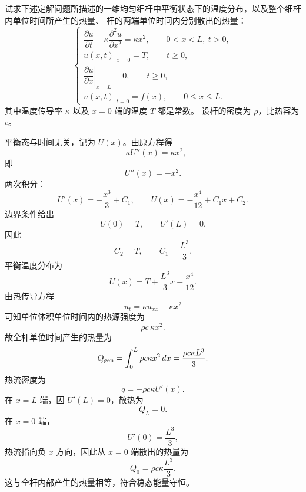 \begin{question}
试求下述定解问题所描述的一维均匀细杆中平衡状态下的温度分布，以及整个细杆内单位时间所产生的热量、
杆的两端单位时间内分别散出的热量：
\[
\begin{cases}
\dfrac{\partial u}{\partial t}-\kappa\dfrac{\partial^2u}{\partial x^2}
=\kappa x^2,\qquad 0<x<L,\ t>0,\\
u(x,t)|_{x=0}=T,\qquad t\ge0,\\
\left.\dfrac{\partial u}{\partial x}\right|_{x=L}=0,\qquad t\ge0,\\
u(x,t)|_{t=0}=f(x),\qquad 0\le x\le L.
\end{cases}
\]
其中温度传导率 \(\kappa\) 以及 \(x=0\) 端的温度 \(T\) 都是常数。
设杆的密度为 \(\rho\)，比热容为 \(c\)。
\begin{solution}
平衡态与时间无关，记为 \(U(x)\)。由原方程得
\[
-\kappa U''(x)=\kappa x^2,
\]
即
\[
U''(x)=-x^2.
\]
两次积分：
\[
U'(x)=-\frac{x^3}{3}+C_1,\qquad
U(x)=-\frac{x^4}{12}+C_1x+C_2.
\]
边界条件给出
\[
U(0)=T,\qquad U'(L)=0.
\]
因此
\[
C_2=T,\qquad C_1=\frac{L^3}{3}.
\]
平衡温度分布为
\[
U(x)=T+\frac{L^3}{3}x-\frac{x^4}{12}.
\]
由热传导方程
\[
u_t=\kappa u_{xx}+\kappa x^2
\]
可知单位体积单位时间内的热源强度为
\[
\rho c\,\kappa x^2.
\]
故全杆单位时间产生的热量为
\[
Q_{\rm gen}=\int_0^L \rho c\kappa x^2\,dx
=\frac{\rho c\kappa L^3}{3}.
\]
热流密度为
\[
q=-\rho c\kappa U'(x).
\]
在 \(x=L\) 端，因 \(U'(L)=0\)，散热为
\[
Q_L=0.
\]
在 \(x=0\) 端，
\[
U'(0)=\frac{L^3}{3},
\]
热流指向负 \(x\) 方向，因此从 \(x=0\) 端散出的热量为
\[
Q_0=\rho c\kappa\frac{L^3}{3}.
\]
这与全杆内部产生的热量相等，符合稳态能量守恒。
\end{solution}
\end{question}

